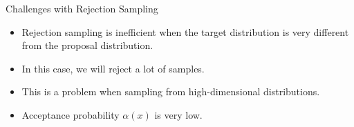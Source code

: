 \documentclass{beamer}
\begin{document}
    \begin{frame}{Challenges with Rejection Sampling}
        \begin{itemize}
            \item Rejection sampling is inefficient when the target distribution is very different from the proposal distribution.
            \item In this case, we will reject a lot of samples.
            \item This is a problem when sampling from high-dimensional distributions.
            \item Acceptance probability $\alpha(x)$ is very low.
        \end{itemize}
    \end{frame}
\end{document}
